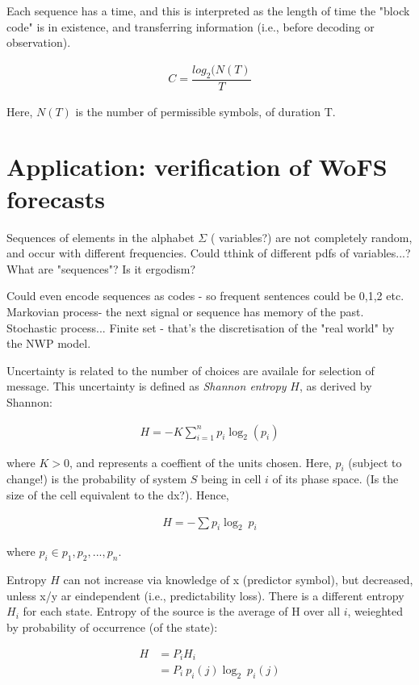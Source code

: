 \documentclass{ametsoc}
\begin{document}
Each sequence has a time, and this is interpreted as the length of time the "block code" is in existence, and transferring information (i.e., before decoding or observation).

\begin{align}\label{eq:C2}
    C = \dfrac{log_2(N(T)}{T}
\end{align}

Here, $N(T)$ is the number of permissible symbols, of duration T.

\section{Application: verification of WoFS forecasts}
Sequences of elements in the alphabet $\Sigma$ ( variables?) are not completely random, and occur with different frequencies. Could tthink of different pdfs of variables...? What are "sequences"? Is it ergodism? 

Could even encode sequences as codes - so frequent sentences could be 0,1,2 etc. Markovian process- the next signal or sequence has memory of the past. Stochastic process... Finite set - that's the discretisation of the "real world" by the NWP model.

Uncertainty is related to the number of choices are availale for selection of message. This uncertainty is defined as \emph{Shannon entropy} $H$, as derived by Shannon:

\begin{align}\label{eq:H}
    H = -K \sum^{n}_{i=1} p_i \log_2(p_i)
\end{align}

where $K > 0$, and represents a coeffient of the units chosen. Here, $p_i$ (subject to change!) is the probability of system $S$ being in cell $i$ of its phase space. (Is the size of the cell equivalent to the dx?). Hence,

\begin{align}
	H = -\sum p_i \log_2~p_i
\end{align}

where $p_i \in {p_1, p_2, ... , p_n}$. 

Entropy $H$ can not increase via knowledge of x (predictor symbol), but decreased, unless x/y ar eindependent (i.e., predictability loss). There is a different entropy $H_i$ for each state. Entropy of the source is the average of H over all $i$, weieghted by probability of occurrence (of the state):

\begin{align}
   H &= P_i H_i \\
     &= P_i~p_i(j)\log_2~p_i(j)
\end{align}
\end{document}
